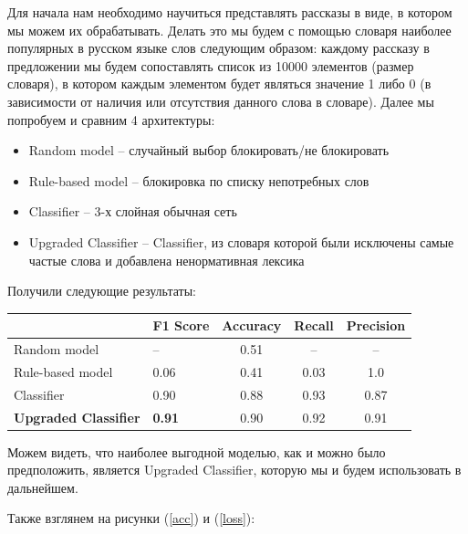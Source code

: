 \documentclass[14pt]{matmex-diploma}
\begin{document}
        Для начала нам необходимо научиться представлять рассказы в виде, в котором мы можем их обрабатывать.
        Делать это мы будем с помощью словаря наиболее популярных в русском языке слов следующим образом:
        каждому рассказу в предложении мы будем сопоставлять список из 10000 элементов (размер словаря), 
        в котором каждым элементом будет являться значение 1 либо 0 (в зависимости от наличия или отсутствия данного слова в словаре).
        Далее мы попробуем и сравним 4 архитектуры:
        
        \begin{itemize}
        	\item Random model – случайный выбор блокировать/не блокировать
        	\item Rule-based model – блокировка по списку непотребных слов
        	\item Classifier – 3-х слойная обычная сеть
        	\item Upgraded Classifier – Classifier, из словаря которой были исключены самые частые слова и добавлена ненормативная лексика
        \end{itemize}
        
        Получили следующие результаты:
        
        \begin{table}[h]
            \begin{tabular}{|l|l|c|c|c|}
            \hline
                                         & F1 Score      & Accuracy & Recall & Precision \\ \hline
            Random model                 & –             & 0.51     & –      & –         \\ \hline
            Rule-based model             & 0.06          & 0.41     & 0.03   & 1.0       \\ \hline
            Classifier                   & 0.90          & 0.88     & 0.93   & 0.87      \\ \hline
            \textbf{Upgraded Classifier} & \textbf{0.91} & 0.90     & 0.92   & 0.91      \\ \hline
            \end{tabular}
        \end{table}
        
        Можем видеть, что наиболее выгодной моделью, как и можно было предположить, является Upgraded Classifier, 
        которую мы и будем использовать в дальнейшем.
        
        Также взглянем на рисунки (\ref{acc}) и (\ref{loss}):
        
\end{document}
